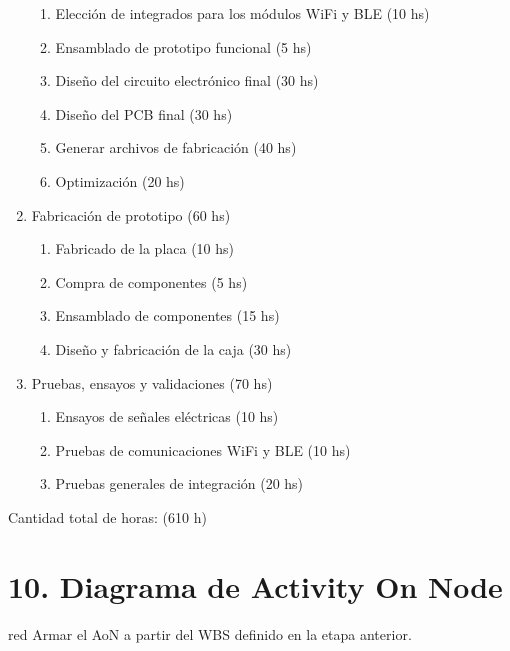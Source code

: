 \documentclass[
11pt, %
codirector, %
]{charter}
\begin{document}
\begin{enumerate}
\begin{enumerate}
    \item Elección de integrados para los módulos WiFi y BLE (10 hs)
	\item Ensamblado de prototipo funcional (5 hs)
	\item Diseño del circuito electrónico final (30 hs)
    \item Diseño del PCB final (30 hs)
    \item Generar archivos de fabricación (40 hs)
    \item Optimización (20 hs)
	\end{enumerate}
 \item Fabricación de prototipo (60 hs)
	\begin{enumerate}
	\item Fabricado de la placa (10 hs)
	\item Compra de componentes (5 hs)
	\item Ensamblado de componentes (15 hs)
	\item Diseño y fabricación de la caja (30 hs)
	\end{enumerate}
  \item Pruebas, ensayos y validaciones (70 hs)
	\begin{enumerate}
	\item Ensayos de señales eléctricas (10 hs)
	\item Pruebas de comunicaciones WiFi y BLE (10 hs)
	\item Pruebas generales de integración (20 hs)
	\end{enumerate}
\end{enumerate}

Cantidad total de horas: (610 h)

\section{10. Diagrama de Activity On Node}
\label{sec:AoN}

\begin{consigna}{red}
Armar el AoN a partir del WBS definido en la etapa anterior. 



\end{consigna}
\end{document}
